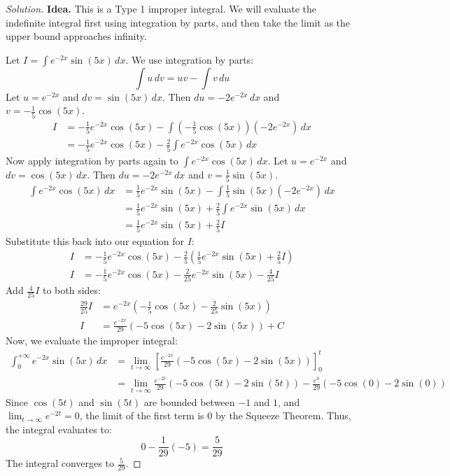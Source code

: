 \documentclass[11pt]{article}
\theoremstyle{definition}
\newenvironment{solution}{\begin{proof}[Solution]}{\end{proof}}
\begin{document}
\begin{solution}
\textbf{Idea.} This is a Type 1 improper integral. We will evaluate the indefinite integral first using integration by parts, and then take the limit as the upper bound approaches infinity.

Let $I = \int e^{-2x} \sin(5x) \,dx$. We use integration by parts:
\[
\int u\,dv = uv - \int v\,du
\]
Let $u = e^{-2x}$ and $dv = \sin(5x)\,dx$. Then $du = -2e^{-2x}\,dx$ and $v = -\frac{1}{5}\cos(5x)$.
\begin{align*}
I &= -\frac{1}{5}e^{-2x}\cos(5x) - \int \left(-\frac{1}{5}\cos(5x)\right) \left(-2e^{-2x}\right) \,dx \\
  &= -\frac{1}{5}e^{-2x}\cos(5x) - \frac{2}{5} \int e^{-2x}\cos(5x) \,dx
\end{align*}
Now apply integration by parts again to $\int e^{-2x}\cos(5x) \,dx$. Let $u = e^{-2x}$ and $dv = \cos(5x)\,dx$. Then $du = -2e^{-2x}\,dx$ and $v = \frac{1}{5}\sin(5x)$.
\begin{align*}
\int e^{-2x}\cos(5x) \,dx &= \frac{1}{5}e^{-2x}\sin(5x) - \int \frac{1}{5}\sin(5x) \left(-2e^{-2x}\right) \,dx \\
&= \frac{1}{5}e^{-2x}\sin(5x) + \frac{2}{5} \int e^{-2x}\sin(5x) \,dx \\
&= \frac{1}{5}e^{-2x}\sin(5x) + \frac{2}{5} I
\end{align*}
Substitute this back into our equation for $I$:
\begin{align*}
I &= -\frac{1}{5}e^{-2x}\cos(5x) - \frac{2}{5} \left( \frac{1}{5}e^{-2x}\sin(5x) + \frac{2}{5} I \right) \\
I &= -\frac{1}{5}e^{-2x}\cos(5x) - \frac{2}{25}e^{-2x}\sin(5x) - \frac{4}{25} I
\end{align*}
Add $\frac{4}{25}I$ to both sides:
\begin{align*}
\frac{29}{25} I &= e^{-2x} \left( -\frac{1}{5}\cos(5x) - \frac{2}{25}\sin(5x) \right) \\
I &= \frac{e^{-2x}}{29} \left( -5\cos(5x) - 2\sin(5x) \right) + C
\end{align*}
Now, we evaluate the improper integral:
\begin{align*}
\int_0^{+\infty} e^{-2x}\sin(5x)\,dx &= \lim_{t \to \infty} \left[ \frac{e^{-2x}}{29} \left( -5\cos(5x) - 2\sin(5x) \right) \right]_0^t \\
&= \lim_{t \to \infty} \frac{e^{-2t}}{29} \left( -5\cos(5t) - 2\sin(5t) \right) - \frac{e^0}{29} \left( -5\cos(0) - 2\sin(0) \right)
\end{align*}
Since $\cos(5t)$ and $\sin(5t)$ are bounded between $-1$ and $1$, and $\lim_{t \to \infty} e^{-2t} = 0$, the limit of the first term is $0$ by the Squeeze Theorem.
Thus, the integral evaluates to:
\[
0 - \frac{1}{29}(-5) = \frac{5}{29}
\]
The integral converges to $\frac{5}{29}$.
\end{solution}
\end{document}
